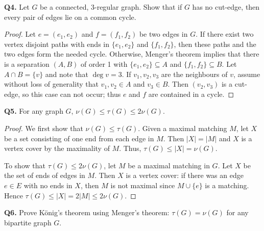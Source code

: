 \documentclass{article}
\begin{document}
\noindent \textbf{Q4.} Let \( G \) be a connected, 3-regular graph. Show that if \( G \) has no cut-edge, then every pair of edges lie on a common cycle.
\begin{proof}
Let \( e = (e_1, e_2) \) and \( f = (f_1, f_2) \) be two edges in \( G \). If there exist two vertex disjoint paths with ends in \( \{ e_1, e_2 \}  \) and \( \{ f_1, f_2 \}  \), then these paths and the two edges form the needed cycle. Otherwise, Menger's theorem implies that there is a separation \( (A,B) \) of order 1 with \( \{ e_1, e_2 \} \subseteq A \) and \( \{ f_1, f_2 \} \subseteq B \). Let \( A \cap B = \{ v \}  \) and note that \( \deg v = 3 \). If \( v_1, v_2, v_3 \) are the neighbours of \( v \), assume without loss of generality that \( v_1, v_2 \in A \) and \( v_3 \in B \). Then \( (v_2, v_3) \) is a cut-edge, so this case can not occur; thus \( e \) and \( f \) are contained in a cycle.
\end{proof}
\noindent \textbf{Q5.} For any graph \( G \), \( \nu (G) \leq \tau (G) \leq 2 \nu (G) \).
\begin{proof}
We first show that \( \nu (G) \leq \tau (G) \). Given a maximal matching \( M \), let \( X \) be a set consisting of one end from each edge in \( M \). Then \( |X| = |M| \) and \( X \) is a vertex cover by the maximality of \( M \). Thus, \( \tau (G) \leq |X| = \nu (G) \).

To show that \( \tau (G) \leq 2 \nu (G) \), let \( M \) be a maximal matching in \( G \). Let \( X \) be the set of ends of edges in \( M \). Then \( X \) is a vertex cover: if there was an edge \( e \in E \) with no ends in \( X \), then \( M \) is not maximal since \( M \cup \{ e \}  \) is a matching. Hence \( \tau (G) \leq |X| = 2 |M| \leq 2 \nu (G) \).
\end{proof}
\noindent \textbf{Q6.} Prove K\"onig's theorem using Menger's theorem: \( \tau (G) = \nu (G) \) for any bipartite graph \( G \).
\end{document}
